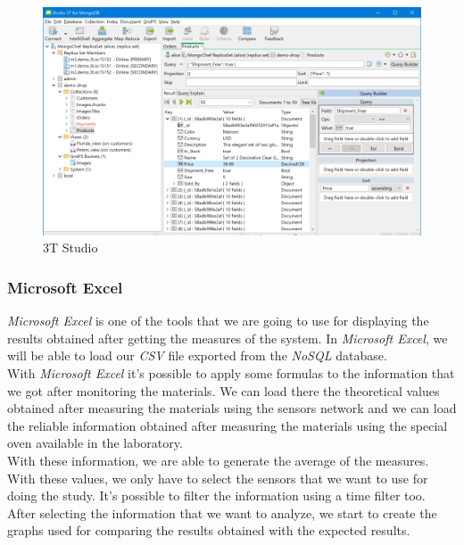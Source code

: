 \begin{figure}[H]
\begin{centering}
\includegraphics[scale=0.4]{IMGS/3T_STUDIO.png}
\caption{3T Studio \label{3T_STUDIO}}
\end{centering}
\end{figure}

\subsubsection{Microsoft Excel}

\textit{Microsoft Excel} is one of the tools that we are going to use for displaying the results obtained after getting the measures of the system. In \textit{Microsoft Excel}, we will be able to load our \textit{CSV} file exported from the \textit{NoSQL} database.\\

With \textit{Microsoft Excel} it's possible to apply some formulas to the information that we got after monitoring the materials. We can load there the theoretical values obtained after measuring the materials using the sensors network and we can load the reliable information obtained after measuring the materials using the special oven available in the laboratory.\\

With these information, we are able to generate the average of the measures. With these values, we only have to select the sensors that we want to use for doing the study. It's possible to filter the information using a time filter too.\\

After selecting the information that we want to analyze, we start to create the graphs used for comparing the results obtained with the expected results.\\

